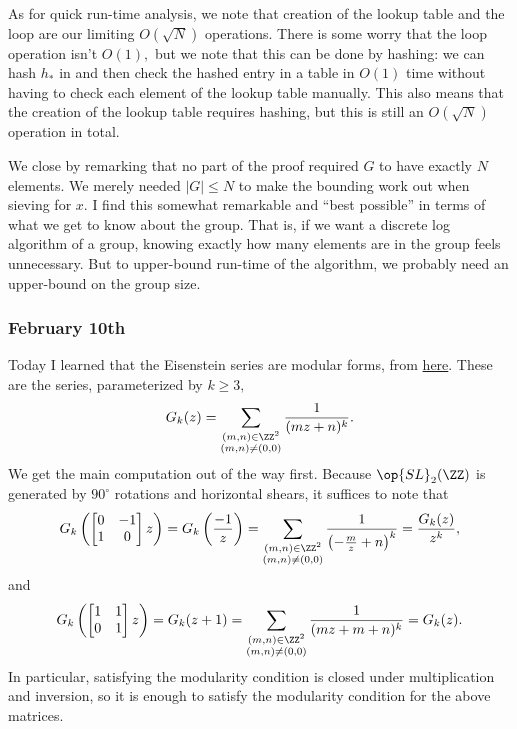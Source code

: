 As for quick run-time analysis, we note that creation of the lookup table and the loop are our limiting $O(\sqrt N)$ operations. There is some worry that the loop operation isn't $O(1),$ but we note that this can be done by hashing: we can hash $h_*$ in and then check the hashed entry in a table in $O(1)$ time without having to check each element of the lookup table manually. This also means that the creation of the lookup table requires hashing, but this is still an $O(\sqrt N)$ operation in total.

We close by remarking that no part of the proof required $G$ to have exactly $N$ elements. We merely needed $|G|\le N$ to make the bounding work out when sieving for $x.$ I find this somewhat remarkable and ``best possible'' in terms of what we get to know about the group. That is, if we want a discrete log algorithm of a group, knowing exactly how many elements are in the group feels unnecessary. But to upper-bound run-time of the algorithm, we probably need an upper-bound on the group size.

\subsubsection{February 10th}
Today I learned that the Eisenstein series are modular forms, from \href{https://www.math.arizona.edu/~swc/}{here}. These are the series, parameterized by $k\ge3,$
\[G_k(z)=\sum_{\substack{(m,n)\in\ZZ^2\\(m,n)\ne(0,0)}}\frac1{(mz+n)^k}.\]
We get the main computation out of the way first. Because $\op{SL}_2(\ZZ)$ is generated by $90^\circ$ rotations and horizontal shears, it suffices to note that
\[G_k\left(\begin{bmatrix}0 & -1 \\ 1 & 0\end{bmatrix}z\right)=G_k\left(\frac{-1}z\right)=\sum_{\substack{(m,n)\in\ZZ^2\\(m,n)\ne(0,0)}}\frac1{\left(-\frac mz+n\right)^k}=\frac{G_k(z)}{z^k},\]
and
\[G_k\left(\begin{bmatrix}1 & 1 \\ 0 & 1\end{bmatrix}z\right)=G_k(z+1)=\sum_{\substack{(m,n)\in\ZZ^2\\(m,n)\ne(0,0)}}\frac1{(mz+m+n)^k}=G_k(z).\]
In particular, satisfying the modularity condition is closed under multiplication and inversion, so it is enough to satisfy the modularity condition for the above matrices.


